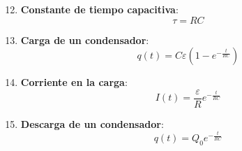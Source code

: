 \documentclass[letterpaper, 12pt]{article}
\newenvironment{kitpropiedades}[1]{%
    \begin{tcolorbox}[colback=celesteSuave, colframe=azulFuerte, title=\textbf{#1}, fonttitle=\bfseries]
}{%
    \end{tcolorbox}
}
\begin{document}
\begin{kitpropiedades}{FORMULARIO DE CIRCUITOS: RÉGIMEN TRANSITORIO RC}
\begin{enumerate}[label=\textbf{\arabic*.}, leftmargin=*, itemsep=0.4cm]
    \setcounter{enumi}{11}

    \item \textbf{Constante de tiempo capacitiva}:
    $$\tau = R C$$

    \item \textbf{Carga de un condensador}:
    $$q(t) = C\varepsilon \left(1 - e^{-\frac{t}{RC}}\right)$$

    \item \textbf{Corriente en la carga}:
    $$I(t) = \frac{\varepsilon}{R} e^{-\frac{t}{RC}}$$

    \item \textbf{Descarga de un condensador}:
    $$q(t) = Q_0 e^{-\frac{t}{RC}}$$

\end{enumerate}
\end{kitpropiedades}
\end{document}
